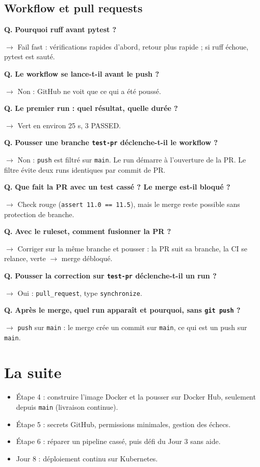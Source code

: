 \documentclass[11pt,a4paper]{article}
\newcommand{\qr}[2]{\par\needspace{4\baselineskip}\noindent\textbf{\textcolor{bleu}{Q.}} \textbf{#1}\par
  \noindent\hspace*{1em}\parbox{\dimexpr\linewidth-1em}{\textcolor{vert}{$\rightarrow$} #2}\par\medskip}
\newcommand{\cmd}[1]{\texttt{#1}}
\begin{document}
\subsection{Workflow et pull requests}
\qr{Pourquoi ruff avant pytest ?}{Fail fast : vérifications rapides d'abord, retour plus rapide ; si ruff échoue, pytest est sauté.}
\qr{Le workflow se lance-t-il avant le push ?}{Non : GitHub ne voit que ce qui a été poussé.}
\qr{Le premier run : quel résultat, quelle durée ?}{Vert en environ 25 s, 3 PASSED.}
\qr{Pousser une branche \cmd{test-pr} déclenche-t-il le workflow ?}{Non : \cmd{push} est filtré sur \cmd{main}. Le run démarre à l'ouverture de la PR. Le filtre évite deux runs identiques par commit de PR.}
\qr{Que fait la PR avec un test cassé ? Le merge est-il bloqué ?}{Check rouge (\cmd{assert 11.0 == 11.5}), mais le merge reste possible sans protection de branche.}
\qr{Avec le ruleset, comment fusionner la PR ?}{Corriger sur la même branche et pousser : la PR suit sa branche, la CI se relance, verte $\rightarrow$ merge débloqué.}
\qr{Pousser la correction sur \cmd{test-pr} déclenche-t-il un run ?}{Oui : \cmd{pull\_request}, type \cmd{synchronize}.}
\qr{Après le merge, quel run apparaît et pourquoi, sans \cmd{git push} ?}{\cmd{push} sur \cmd{main} : le merge crée un commit sur \cmd{main}, ce qui est un push sur \cmd{main}.}

\section{La suite}
\begin{itemize}
  \item Étape 4 : construire l'image Docker et la pousser sur Docker Hub, seulement depuis \cmd{main} (livraison continue).
  \item Étape 5 : secrets GitHub, permissions minimales, gestion des échecs.
  \item Étape 6 : réparer un pipeline cassé, puis défi du Jour 3 sans aide.
  \item Jour 8 : déploiement continu sur Kubernetes.
\end{itemize}
\end{document}
